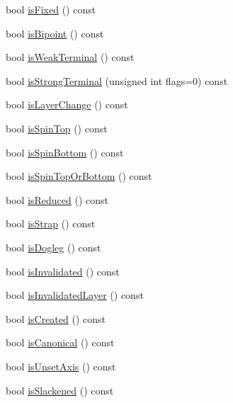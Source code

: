 \begin{DoxyCompactItemize}
\item 
bool \hyperlink{classKatabatic_1_1AutoSegment_afd7362b850709bed8b61c1aa22399f97}{is\+Fixed} () const
\item 
bool \hyperlink{classKatabatic_1_1AutoSegment_a72741158d19af38e84c5e9c08f91270f}{is\+Bipoint} () const
\item 
bool \hyperlink{classKatabatic_1_1AutoSegment_aef3a61d223be84ac336c4f7bc64884ba}{is\+Weak\+Terminal} () const
\item 
bool \hyperlink{classKatabatic_1_1AutoSegment_a4605c9284168f0a62fa48aa2d3ae5ee9}{is\+Strong\+Terminal} (unsigned int flags=0) const
\item 
bool \hyperlink{classKatabatic_1_1AutoSegment_a772596f5d5fa897822dbd0da37024735}{is\+Layer\+Change} () const
\item 
bool \hyperlink{classKatabatic_1_1AutoSegment_a3776b8258ab6544c9551d0714fcc75d2}{is\+Spin\+Top} () const
\item 
bool \hyperlink{classKatabatic_1_1AutoSegment_ab786dbdb67ea727369b1a988497c01d1}{is\+Spin\+Bottom} () const
\item 
bool \hyperlink{classKatabatic_1_1AutoSegment_a90d934f7275aed35f4ecb157c6950d6f}{is\+Spin\+Top\+Or\+Bottom} () const
\item 
bool \hyperlink{classKatabatic_1_1AutoSegment_a461c31a8d12458939b78ccecb3b8c299}{is\+Reduced} () const
\item 
bool \hyperlink{classKatabatic_1_1AutoSegment_a62d61c231cf404a814ae37665fa8164f}{is\+Strap} () const
\item 
bool \hyperlink{classKatabatic_1_1AutoSegment_a75d91371e5281dd21f60ff39ae70a3e5}{is\+Dogleg} () const
\item 
bool \hyperlink{classKatabatic_1_1AutoSegment_ac540608485240ff88970131ebc02c1ab}{is\+Invalidated} () const
\item 
bool \hyperlink{classKatabatic_1_1AutoSegment_a77b075644356f016105b3050b031a2ec}{is\+Invalidated\+Layer} () const
\item 
bool \hyperlink{classKatabatic_1_1AutoSegment_af7d9cf1d7581b1cab04cf38c64f0f72a}{is\+Created} () const
\item 
bool \hyperlink{classKatabatic_1_1AutoSegment_af6d3008d345195a99e0341f0379c33b7}{is\+Canonical} () const
\item 
bool \hyperlink{classKatabatic_1_1AutoSegment_a2bd22f431b7cf3695babab78fc3b4c9e}{is\+Unset\+Axis} () const
\item 
bool \hyperlink{classKatabatic_1_1AutoSegment_a782cff57d3fe10e758d19ee65a06643d}{is\+Slackened} () const

\end{DoxyCompactItemize}
